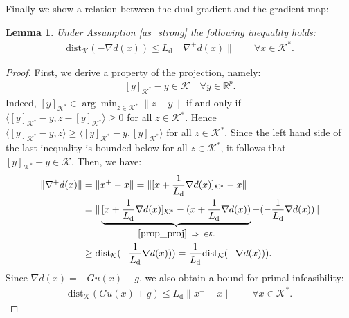 \documentclass{gOMS2e}
\theoremstyle{plain}
\newtheorem{lemma}[theorem]{Lemma}
\theoremstyle{definition}
\theoremstyle{remark}
\begin{document}
\noindent Finally we show a  relation between the dual gradient and
the gradient map:
\begin{lemma}
\label{lemma2_dg} Under Assumption \ref{as_strong} the following
inequality holds:
\begin{align}
\label{decrease_ggm} \text{dist}_{\mathcal{K}} \left(- \nabla d(x) \right) \leq L_\text{d}
\|\nabla^+ d(x)\|  \qquad \forall x \in {\mathcal{K}}^*.
\end{align}
\end{lemma}

\begin{proof}
First, we derive a property of the projection, namely:
\begin{align}
\label{prop_proj} [y]_{{\mathcal{K}}^*} - y \in {\mathcal{K}} \quad \forall y \in
{\mathbb{R}}^p.
\end{align}
Indeed, $[y]_{{\mathcal{K}}^*} \in \arg \min_{z \in {\mathcal{K}}^*} \|z - y\|$ if and
only if $\langle [y]_{{\mathcal{K}}^*} -y, z - [y]_{{\mathcal{K}}^*} \rangle \geq 0$ for
all $z \in {\mathcal{K}}^*$. Hence $\langle [y]_{{\mathcal{K}}^*} -y, z \rangle  \geq
\langle [y]_{{\mathcal{K}}^*} - y, [y]_{{\mathcal{K}}^*} \rangle$ for all $z \in {\mathcal{K}}^*$.
Since the left hand side of the last inequality is bounded  below
for all $z \in {\mathcal{K}}^*$, it follows that $[y]_{{\mathcal{K}}^*} -y \in {\mathcal{K}}$.
Then, we have:
\begin{align*}
\|\nabla^+ d(x)\| & = \| x^+ -x \| =  \|[x + \frac{1}{L_\text{d}}
\nabla
d(x)]_{{\mathcal{K}}^*} - x\| \\
& = \| \underbrace{[x + \frac{1}{L_\text{d}} \nabla d(x)]_{{\mathcal{K}}^*}  -
(x + \frac{1}{L_\text{d}} \nabla d(x))}_{\eqref{prop_proj} \;\;
\Rightarrow \;\; \in {\mathcal{K}}} - (-\frac{1}{L_\text{d}}
\nabla d(x)) \| \\
& \geq \text{dist}_{\mathcal{K}}(-\frac{1}{L_\text{d}} \nabla d(x))) =
\frac{1}{L_\text{d}} \text{dist}_{\mathcal{K}}(- \nabla d(x))).
\end{align*}
Since $\nabla d(x) =  - G u(x) - g$, we also obtain a bound for
primal infeasibility:
\begin{align}
\label{map_feas} \text{dist}_{\mathcal{K}}(G u(x) + g) \leq L_\text{d} \|
x^+ - x\|  \qquad \forall x \in {\mathcal{K}}^*.
\end{align}
\end{proof}
\end{document}
